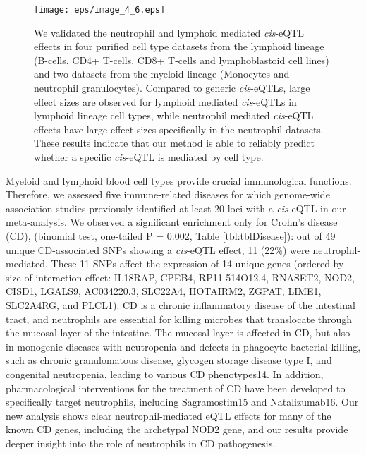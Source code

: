   \begin{figure}[h!]
  \centering
  \texttt{[image: eps/image\_4\_6.eps]}
  \caption[Validation]{We validated the neutrophil and lymphoid mediated \emph{cis}-eQTL effects in four purified cell 
                       type datasets from the lymphoid lineage (B-cells, CD4+ T-cells, CD8+ T-cells and 
                       lymphoblastoid cell lines) and two datasets from the myeloid lineage (Monocytes and 
                       neutrophil granulocytes). Compared to generic \emph{cis}-eQTLs, large effect sizes are observed 
                       for lymphoid mediated \emph{cis}-eQTLs in lymphoid lineage cell types, while neutrophil mediated 
                       \emph{cis}-eQTL effects have large effect sizes specifically in the neutrophil datasets. These 
                       results indicate that our method is able to reliably predict whether a specific \emph{cis}-eQTL 
                       is mediated by cell type. }
          \label{fig:fig4_6}
  \end{figure}

  Myeloid and lymphoid blood cell types provide crucial immunological functions. Therefore, we assessed five immune-related diseases 
  for which genome-wide association studies previously identified at least 20 loci with a \emph{cis}-eQTL in our meta-analysis. We observed 
  a significant enrichment only for Crohn's disease (CD), (binomial test, one-tailed P = 0.002, Table \ref{tbl:tblDisease}): out of 49 
  unique CD-associated SNPs showing a \emph{cis}-eQTL effect, 11 (22\%) were neutrophil-mediated. These 11 SNPs affect the expression of 14 
  unique genes (ordered by size of interaction effect: IL18RAP, CPEB4, RP11-514O12.4, RNASET2, NOD2, CISD1, LGALS9, AC034220.3, SLC22A4, 
  HOTAIRM2, ZGPAT, LIME1, SLC2A4RG, and PLCL1). CD is a chronic inflammatory disease of the intestinal tract, and neutrophils are essential 
  for killing microbes that translocate through the mucosal layer of the intestine. The mucosal layer is affected in CD, but also in 
  monogenic diseases with neutropenia and defects in phagocyte bacterial killing, such as chronic granulomatous disease, glycogen storage 
  disease type I, and congenital neutropenia, leading to various CD phenotypes14. In addition, pharmacological interventions for the 
  treatment of CD have been developed to specifically target neutrophils, including Sagramostim15 and Natalizumab16. Our new analysis 
  shows clear neutrophil-mediated eQTL effects for many of the known CD genes, including the archetypal NOD2 gene, and our results 
  provide deeper insight into the role of neutrophils in CD pathogenesis.

